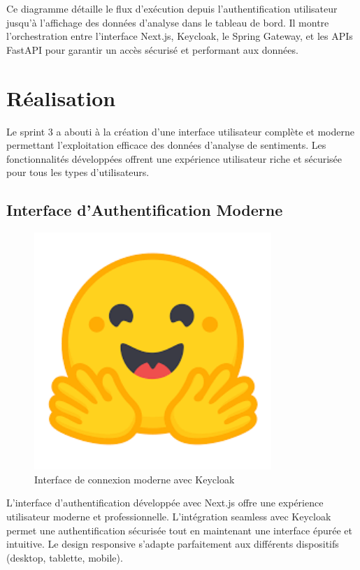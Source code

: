 Ce diagramme détaille le flux d'exécution depuis l'authentification utilisateur jusqu'à l'affichage des données d'analyse dans le tableau de bord. Il montre l'orchestration entre l'interface Next.js, Keycloak, le Spring Gateway, et les APIs FastAPI pour garantir un accès sécurisé et performant aux données.

\section{Réalisation}

Le sprint 3 a abouti à la création d'une interface utilisateur complète et moderne permettant l'exploitation efficace des données d'analyse de sentiments. Les fonctionnalités développées offrent une expérience utilisateur riche et sécurisée pour tous les types d'utilisateurs.

\subsection{Interface d'Authentification Moderne}

\begin{figure}[H]
\centering
\includegraphics[width=0.8\textwidth]{assets/images/face.png}
\caption{Interface de connexion moderne avec Keycloak}
\label{fig:modern-login}
\end{figure}

L'interface d'authentification développée avec Next.js offre une expérience utilisateur moderne et professionnelle. L'intégration seamless avec Keycloak permet une authentification sécurisée tout en maintenant une interface épurée et intuitive. Le design responsive s'adapte parfaitement aux différents dispositifs (desktop, tablette, mobile).

